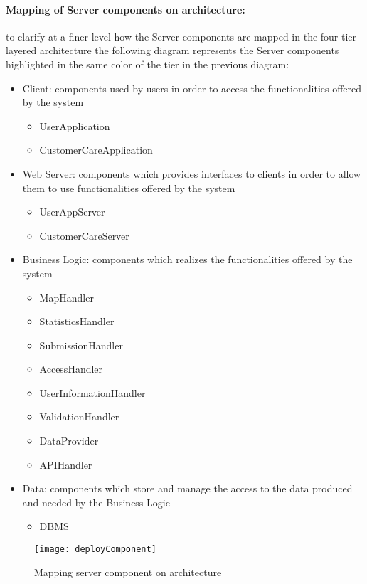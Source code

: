 \paragraph{Mapping of Server components on architecture:}to clarify at a finer level how the Server components are mapped in the four tier layered architecture the following diagram represents the Server components highlighted in the same color of the tier in the previous diagram:
\begin{itemize}
	\item Client: components used by users in order to access the functionalities offered by the system
		\begin{itemize}
			\item UserApplication
			\item CustomerCareApplication
		\end{itemize}
	\item Web Server: components which provides interfaces to clients in order to allow them to use functionalities offered by the system
		\begin{itemize}
			\item UserAppServer
			\item CustomerCareServer
		\end{itemize}
	\item Business Logic: components which realizes the functionalities offered by the system
		\begin{itemize}
			\item MapHandler
			\item StatisticsHandler
			\item SubmissionHandler
			\item AccessHandler
			\item UserInformationHandler
			\item ValidationHandler
			\item DataProvider
			\item APIHandler
		\end{itemize}
	\item Data: components which store and manage the access to the data produced and needed by the Business Logic
		\begin{itemize}
			\item DBMS
		\end{itemize}
\end{itemize}

\begin{figure}[h]
			\centering
			\texttt{[image: deployComponent]}
			\caption{
				\label{fig:deployServerComponent} 
				Mapping server component on architecture
			}
		\end{figure}
\clearpage


